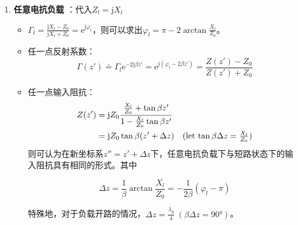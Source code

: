 \begin{enumerate}
        \item {\bfseries 任意电抗负载} ：代入$Z_l=\mathrm{j} X_l$
        \begin{itemize}
            \item $\varGamma_l=\frac{\mathrm{j}X_l-Z_0}{\mathrm{j}X_l+Z_0}=\mathrm{e}^{\mathrm{j}\varphi_l}$，则可以求出$\varphi_l=\pi-2\arctan\frac{X_l}{Z_0}$。
            \item 任一点反射系数：
                \begin{equation}
                    \varGamma(z')\doteq\varGamma_l \mathrm{e}^{-2\mathrm{j}\beta z'}=\mathrm{e}^{\mathrm{j}(\varphi_l-2\beta z')}=\frac{Z(z')-Z_0}{Z(z')+Z_0}
                \end{equation}
            \item 任一点输入阻抗：
                \begin{align}
                    Z(z')&=\mathrm{j}Z_0\frac{\frac{X_l}{Z_0}+\tan{\beta z'}}{1-\frac{X_l}{Z_0}\tan{\beta z'}}\notag\\
                    &=\mathrm{j}Z_0\tan{\beta(z'+\Delta z)}\quad\mbox{(let $\tan{\beta \Delta z}=\frac{X_l}{Z_0}$)}
                \end{align}
                则可认为在新坐标系$z''=z'+\Delta z$下，任意电抗负载下与短路状态下的输入阻抗具有相同的形式。其中

                \begin{equation}
                    \Delta z=\frac{1}{\beta}\arctan\frac{X_l}{Z_0}=-\frac{1}{2\beta}(\varphi_l-\pi)
                \end{equation}


                特殊地，对于负载开路的情况，$\Delta z=\frac{\lambda_g}{4}\;(\beta \Delta z=90\si{\degree})$。



\end{itemize}
\end{enumerate}
